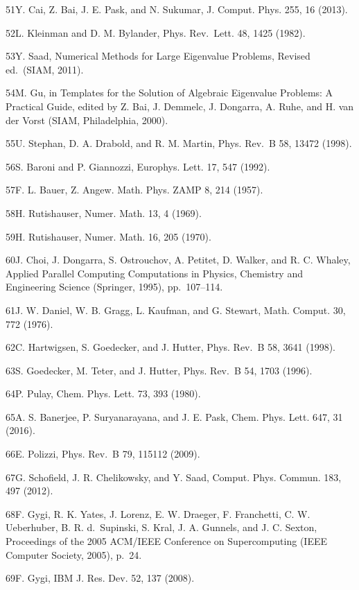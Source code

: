 \documentclass[
  10
]{article}
\begin{document}
51Y. Cai, Z. Bai, J. E. Pask, and N. Sukumar, J. Comput. Phys. 255, 16
(2013).

52L. Kleinman and D. M. Bylander, Phys. Rev.~Lett. 48, 1425 (1982).

53Y. Saad, Numerical Methods for Large Eigenvalue Problems, Revised
ed.~(SIAM, 2011).

54M. Gu, in Templates for the Solution of Algebraic Eigenvalue Problems:
A Practical Guide, edited by Z. Bai, J. Demmelc, J. Dongarra, A. Ruhe,
and H. van der Vorst (SIAM, Philadelphia, 2000).

55U. Stephan, D. A. Drabold, and R. M. Martin, Phys. Rev.~B 58, 13472
(1998).

56S. Baroni and P. Giannozzi, Europhys. Lett. 17, 547 (1992).

57F. L. Bauer, Z. Angew. Math. Phys. ZAMP 8, 214 (1957).

58H. Rutishauser, Numer. Math. 13, 4 (1969).

59H. Rutishauser, Numer. Math. 16, 205 (1970).

60J. Choi, J. Dongarra, S. Ostrouchov, A. Petitet, D. Walker, and R. C.
Whaley, Applied Parallel Computing Computations in Physics, Chemistry
and Engineering Science (Springer, 1995), pp.~107--114.

61J. W. Daniel, W. B. Gragg, L. Kaufman, and G. Stewart, Math. Comput.
30, 772 (1976).

62C. Hartwigsen, S. Goedecker, and J. Hutter, Phys. Rev.~B 58, 3641
(1998).

63S. Goedecker, M. Teter, and J. Hutter, Phys. Rev.~B 54, 1703 (1996).

64P. Pulay, Chem. Phys. Lett. 73, 393 (1980).

65A. S. Banerjee, P. Suryanarayana, and J. E. Pask, Chem. Phys. Lett.
647, 31 (2016).

66E. Polizzi, Phys. Rev.~B 79, 115112 (2009).

67G. Schofield, J. R. Chelikowsky, and Y. Saad, Comput. Phys. Commun.
183, 497 (2012).

68F. Gygi, R. K. Yates, J. Lorenz, E. W. Draeger, F. Franchetti, C. W.
Ueberhuber, B. R. d.~Supinski, S. Kral, J. A. Gunnels, and J. C. Sexton,
Proceedings of the 2005 ACM/IEEE Conference on Supercomputing (IEEE
Computer Society, 2005), p.~24.

69F. Gygi, IBM J. Res. Dev. 52, 137 (2008).
\end{document}
